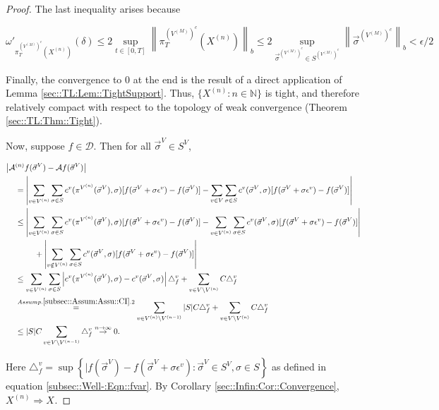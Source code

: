 \documentclass[12pt]{article}
\newcommand{\mb}{\mathbb}
\newcommand{\mc}{\mathcal}
\newcommand{\ra}{\rightarrow}
\newcommand{\os}{\overset}
\newcommand{\ep}{\epsilon}
\newcommand{\ind}{\hspace{24pt}}
\renewcommand{\v}{v}							%
\renewcommand{\S}{S}							%
\newcommand{\s}{\sigma}							%
\newcommand{\sv}{\vec{\s}}						%
\renewcommand{\b}{b}							%
\newcommand{\ev}{\ep}							%
\newcommand{\T}{T}								%
\renewcommand{\t}{t}							%
\newcommand{\proj}{\pi}							%
\newcommand{\X}{X}								%
\newcommand{\IG}{\mc{A}}						%
\newcommand{\IGr}{c}							%
\newcommand{\f}{f}								%
\newcommand{\vind}[1]{^{#1}}					%
\newcommand{\carp}[1]{^{#1}}					%
\newcommand{\vsi}[1]{^{#1}}						%
\newcommand{\cind}[1]{_{#1}}					%
\newcommand{\tip}[1]{#1}						%
\newcommand{\ts}[1]{_{#1}}						%
\newcommand{\const}{C}							%
\newcommand{\sln}[1]{^{(#1)}}					%
\newcommand{\core}{\mc{D}}						%
\newcommand{\delt}{\triangle}					%
\newcommand{\cconst}{M}							%
\newcommand{\cmodu}{\omega'}					%
\newcommand{\deltf}[1]{_{#1}}					%
\newcommand{\pra}[1]{_{#1}}						%
\newcommand{\indx}[1]{_{#1}}					%
\begin{document}
\begin{proof}
The last inequality arises because

\[\cmodu\pra{\proj\vsi{\left(V\sln{\cconst}\right)^c}\ts{\T}(\X\sln{n}\cind{}\tip{})}(\delta) \leq 2 \sup_{\t\in [0,\T]} \left\|\proj\vsi{\left(V\sln{\cconst}\right)^c}\ts{\T}(\X\sln{n}\cind{}\tip{})\right\|_{\b} \leq 2 \sup_{\sv\cind{}\vsi{\left(V\sln{\cconst}\right)^c} \in \S\carp{\left(V\sln{\cconst}\right)^c}} \left\|\sv\cind{}\vsi{\left(V\sln{\cconst}\right)^c}\right\|_{\b} < \ep/2\]

Finally, the convergence to 0 at the end is the result of a direct application of Lemma \ref{sec::TL:Lem::TightSupport}. Thus, \(\{\X\sln{n}\cind{}\tip{}:n\in \mb{N}\}\) is tight, and therefore relatively compact with respect to the topology of weak convergence (Theorem \ref{sec::TL:Thm::Tight}).

Now, suppose \(f\in \core\). Then for all \(\sv\cind{}\vsi{V} \in \S\carp{V}\),

\begin{align*}
\big|\IG&\sln{n}f(\sv\cind{}\vsi{V}) - \IG f(\sv\cind{}\vsi{V})\big|\\
&= \left|\sum_{\v \in V\sln{n}} \sum_{\s \in \S} \IGr\vind{\v}(\proj\vsi{V\sln{n}}\ts{}(\sv\cind{}\vsi{V}),\s)[f(\sv\cind{}\vsi{V}+\s\ev\vind{\v}) - f(\sv\cind{}\vsi{V})] - \sum_{\v \in V}\sum_{\s \in \S} \IGr\vind{\v}(\sv\cind{}\vsi{V},\s)[f(\sv\cind{}\vsi{V}+\s\ev\vind{\v}) - f(\sv\cind{}\vsi{V})]\right|\\
&\leq  \left|\sum_{\v \in V\sln{n}} \sum_{\s \in \S} \IGr\vind{\v}(\proj\vsi{V\sln{n}}\ts{}(\sv\cind{}\vsi{V}),\s)[f(\sv\cind{}\vsi{V}+\s\ev\vind{\v}) - f(\sv\cind{}\vsi{V})] - \sum_{\v \in V\sln{n}}\sum_{\s \in \S} \IGr\vind{\v}(\sv\cind{}\vsi{V},\s)[f(\sv\cind{}\vsi{V}+\s\ev\vind{\v}) - f(\sv\cind{}\vsi{V})]\right|\\
&\ind  +\left|\sum_{\v \notin V\sln{n}} \sum_{\s\in \S} \IGr\vind{\v}(\sv\cind{}\vsi{V},\s)[f(\sv\cind{}\vsi{V}+\s\ev\vind{\v}) - f(\sv\cind{}\vsi{V})]\right|\\
&\leq \sum_{\v \in V\sln{n}}\sum_{\s \in \S} \left|\IGr\vind{\v}(\proj\vsi{V\sln{n}}\ts{}(\sv\cind{}\vsi{V}),\s) - \IGr\vind{\v}(\sv\cind{}\vsi{V},\s)\right|\delt\deltf{\f}\vind{\v} + \sum_{\v \in V\setminus V\sln{n}} \const\indx{}\delt\deltf{\f}\vind{\v}\\
&\os{Assump. \ref{subsec::Assum:Assu::CI}.2}{=} \sum_{\v \in V\sln{n}\setminus V\sln{n-1}} |\S|\const\indx{} \delt\deltf{\f}\vind{\v} + \sum_{\v \in V\setminus V\sln{n}} \const\indx{}\delt\deltf{\f}\vind{\v}\\
&\leq |\S|C\sum_{\v \in V\setminus V\sln{n-1}} \delt\deltf{\f}\vind{\v} \os{n\ra\infty}{\ra} 0.
\end{align*}

Here \(\delt\deltf{\f}\vind{\v} = \sup\left\{|f(\sv\cind{}\vsi{V}) - f(\sv\cind{}\vsi{V} + \s\ev\vind{\v}): \sv\cind{}\vsi{V}\in \S\carp{V},\s \in \S\right\}\) as defined in equation \eqref{subsec::Well-:Eqn::fvar}. By Corollary \ref{sec::Infin:Cor::Convergence}, \(\X\sln{n}\cind{}\tip{}\Rightarrow \X\cind{}\tip{}\).
\end{proof}
\end{document}

